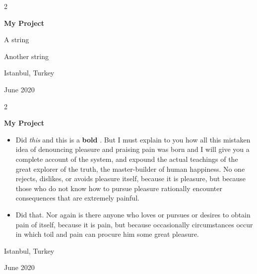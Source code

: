 \documentclass[10pt, letterpaper]{article}
\newenvironment{summary}{
    \begin{description}[
        topsep=0.10 cm,
        parsep=0.10 cm,
        partopsep=0pt,
        itemsep=0pt,
        leftmargin=0.4 cm + 10pt
    ]
}{
    \end{description}
} %
\newenvironment{highlights}{
    \begin{itemize}[
        topsep=0.10 cm,
        parsep=0.10 cm,
        partopsep=0pt,
        itemsep=0pt,
        leftmargin=0.4 cm + 10pt
    ]
}{
    \end{itemize}
} %
\newenvironment{twocolentry}[2][]{
    \onecolentry
    \def\secondColumn{#2}
    \setcolumnwidth{\fill, 4.5 cm}
    \begin{paracol}{2}
}{
    \switchcolumn \raggedleft \secondColumn
    \end{paracol}
    \endonecolentry
} %
\let\hrefWithoutArrow\href
\renewcommand{\href}[2]{\hrefWithoutArrow{#1}{\ifthenelse{\equal{#2}{}}{ }{#2 }\raisebox{.15ex}{\footnotesize \faExternalLink*}}}
\begin{document}
        \begin{twocolentry}{
            Istanbul, Turkey

        June 2020
        }
            \textbf{My Project}
            \begin{summary}
                \item A string
                \item Another string
            \end{summary}
        \end{twocolentry}


        \vspace{0.2 cm}

        \begin{twocolentry}{
            Istanbul, Turkey

        June 2020
        }
            \textbf{My Project}
            \begin{highlights}
                \item Did \textit{this} and this is a \textbf{bold} \href{https://example.com}{link}. But I must explain to you how all this mistaken idea of denouncing pleasure and praising pain was born and I will give you a complete account of the system, and expound the actual teachings of the great explorer of the truth, the master-builder of human happiness. No one rejects, dislikes, or avoids pleasure itself, because it is pleasure, but because those who do not know how to pursue pleasure rationally encounter consequences that are extremely painful.
                \item Did that. Nor again is there anyone who loves or pursues or desires to obtain pain of itself, because it is pain, but because occasionally circumstances occur in which toil and pain can procure him some great pleasure.
            \end{highlights}
        \end{twocolentry}


        \vspace{0.2 cm}
\end{document}
